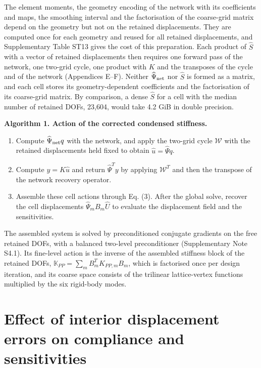 \documentclass[preprint,12pt,authoryear]{elsarticle}
\providecommand{\tightlist}{\setlength{\itemsep}{0pt}\setlength{\parskip}{0pt}}
\begin{document}
The element moments, the geometry encoding of the network with its coefficients and maps, the smoothing interval and the factorisation of the coarse-grid matrix depend on the geometry but not on the retained displacements. They are computed once for each geometry and reused for all retained displacements, and Supplementary Table ST13 gives the cost of this preparation. Each product of \(\widehat S\) with a vector of retained displacements then requires one forward pass of the network, one two-grid cycle, one product with \(K\) and the transposes of the cycle and of the network (Appendices E--F). Neither \(\widehat\Psi_{\rm net}\) nor \(\widehat S\) is formed as a matrix, and each cell stores its geometry-dependent coefficients and the factorisation of its coarse-grid matrix. By comparison, a dense \(\widehat S\) for a cell with the median number of retained DOFs, 23,604, would take 4.2 GiB in double precision.

\textbf{Algorithm 1. Action of the corrected condensed stiffness.}

\begin{enumerate}
\def\labelenumi{\arabic{enumi}.}
\tightlist
\item
  Compute \(\widehat\Psi_{\rm net}q\) with the network, and apply the two-grid cycle \(\mathcal W\) with the retained displacements held fixed to obtain \(\widehat u=\widehat\Psi q\).
\item
  Compute \(y=K\widehat u\) and return \(\widehat\Psi^Ty\) by applying \(\mathcal W^T\) and then the transpose of the network recovery operator.
\item
  Assemble these cell actions through Eq. (3). After the global solve, recover the cell displacements \(\widehat\Psi_mB_m\widehat U\) to evaluate the displacement field and the sensitivities.
\end{enumerate}

The assembled system is solved by preconditioned conjugate gradients on the free retained DOFs, with a balanced two-level preconditioner (Supplementary Note S4.1). Its fine-level action is the inverse of the assembled stiffness block of the retained DOFs, \(\mathbb K_{PP}=\sum_mB_m^TK_{PP,m}B_m\), which is factorised once per design iteration, and its coarse space consists of the trilinear lattice-vertex functions multiplied by the six rigid-body modes.

\section{Effect of interior displacement errors on compliance and sensitivities}
\end{document}
